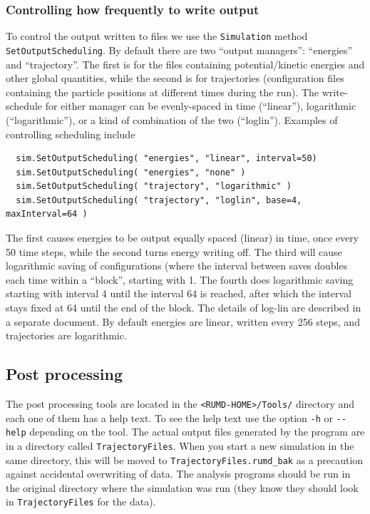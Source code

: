 \subsubsection{Controlling how frequently to write output}

To control the output written to files we use the \verb|Simulation|
method \verb|SetOutputScheduling|. By default there are two ``output
managers'': ``energies'' and ``trajectory''. The first is for the files 
containing potential/kinetic energies and other global
quantities, while the second is for trajectories (configuration files 
containing the particle positions at different times during the run). 
The write-schedule for either manager
can be evenly-spaced in time (``linear''), 
logarithmic (``logarithmic''), or a  kind of combination of the two 
(``loglin''). Examples of controlling scheduling include

\begin{verbatim}
  sim.SetOutputScheduling( "energies", "linear", interval=50)
  sim.SetOutputScheduling( "energies", "none" )
  sim.SetOutputScheduling( "trajectory", "logarithmic" )
  sim.SetOutputScheduling( "trajectory", "loglin", base=4, maxInterval=64 )
\end{verbatim}

The first causes energies to be output equally spaced (linear) in time, once 
every 50 time steps, while the second turns energy writing off. The third
 will cause logarithmic saving of configurations (where the 
interval between saves doubles 
each time within a ``block'', starting with 1. The fourth does
logarithmic saving starting with interval 4 until the interval 64 is
reached, after which the interval stays fixed at 64 until the end of
the block. The details of log-lin  are described in a separate
document.  By default energies are linear, written every 256 steps,
and trajectories are logarithmic.  


\subsection{\label{postProcessing} Post processing}

The post processing tools are located in the \verb=<RUMD-HOME>/Tools/=
directory and each one of them has a help text. To see the help text
use the option \verb|-h| or \verb|--help| depending on the tool. 
The actual output files generated by the program are in a
directory called \verb|TrajectoryFiles|. When you start a new simulation in the
same directory, this will be moved to \verb|TrajectoryFiles.rumd_bak| as 
a precaution against accidental overwriting of data. The analysis 
programs should be run in the original directory where the simulation was run
(they know they should look in \verb|TrajectoryFiles| for the data).


